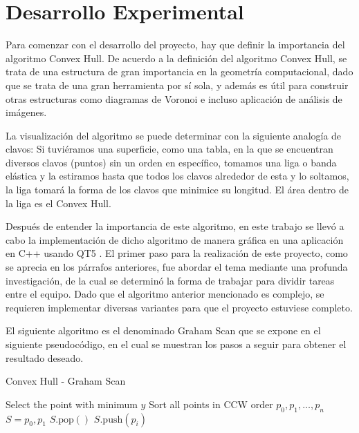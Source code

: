 \documentclass[conference]{IEEEtran}
\begin{document}
\section{Desarrollo Experimental}

Para comenzar con el desarrollo del proyecto, hay que definir la importancia del algoritmo \cite{algorithm} Convex Hull. De acuerdo a la definición del algoritmo Convex Hull, se trata de una estructura de gran importancia en la geometría computacional, dado que se trata de una gran herramienta por sí sola, y además es útil para construir otras estructuras como diagramas de Voronoi e incluso aplicación de análisis de imágenes.

La visualización del algoritmo se puede determinar con la siguiente analogía de clavos: Si tuviéramos una superficie, como una tabla, en la que se encuentran diversos clavos (puntos) sin un orden en específico, tomamos una liga o banda elástica y la estiramos hasta que todos los clavos alrededor de esta y lo soltamos, la liga tomará la forma de los clavos que minimice su longitud. El área dentro de la liga es el Convex Hull.

Después de entender la importancia de este algoritmo, en este trabajo se llevó a cabo la implementación de dicho algoritmo de manera gráfica en una aplicación en C++ usando QT5 \cite{qt}. El primer paso para la realización de este proyecto, como se aprecia en los párrafos anteriores, fue abordar el tema mediante una profunda investigación, de la cual se determinó la forma de trabajar para dividir tareas entre el equipo. Dado que el algoritmo anterior mencionado es complejo, se requieren implementar diversas variantes para que el proyecto estuviese completo.

El siguiente algoritmo es el denominado Graham Scan que se expone en el siguiente pseudocódigo, en el cual se muestran los pasos a seguir para obtener el resultado deseado.

\begin{algorithm}
\caption{Convex Hull - Graham Scan}
\begin{algorithmic}[1]
\STATE Select the point with minimum $y$
\STATE Sort all points in CCW order $p_0, p_1, \ldots, p_n$
\STATE $S = p_0, p_1$
    	\STATE $S.\text{pop}()$
	\ENDWHILE
	\STATE $S.\text{push}(p_i)$
\ENDFOR
\end{algorithmic}
\end{algorithm}
\end{document}
